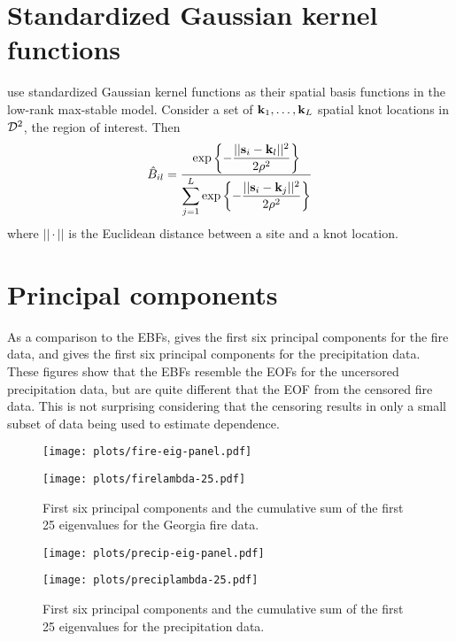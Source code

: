 \section{Standardized Gaussian kernel functions} \label{eba:gskfunctions}
\citet{Reich2012} use standardized Gaussian kernel functions as their spatial basis functions in the low-rank max-stable model.
Consider a set of $\mathbf{k}_1, \ldots, \mathbf{k}_L$ spatial knot locations in ${\cal D}^2$, the region of interest.
Then
\begin{align}
  \hat{B}_{il} = \frac{\exp\left\{- \displaystyle\frac{||\mathbf{s}_i - \mathbf{k}_l||^2}{2 \rho^2} \right\}}{\displaystyle \sum_{j = 1}^L \exp\left\{- \frac{||\mathbf{s}_i - \mathbf{k}_j||^2}{2 \rho^2} \right\}}
\end{align}
where $|| \cdot ||$ is the Euclidean distance between a site and a knot location.

\section{Principal components} \label{eba:pca}
As a comparison to the EBFs,  gives the first six principal components for the fire data, and  gives the first six principal components for the precipitation data.
These figures show that the EBFs resemble the EOFs  for the uncersored precipitation data, but are quite different that the EOF from the censored fire data.
This is not surprising considering that the censoring results in only a small subset of data being used to estimate dependence.
\begin{figure}[htbp] %
  \centering
  \texttt{[image: plots/fire-eig-panel.pdf]}

  \texttt{[image: plots/firelambda-25.pdf]}
  \caption{First six principal components and the cumulative sum of the first 25 eigenvalues for the Georgia fire data.}
  \label{ebfig:fire-eigpanel}
\end{figure}


\begin{figure}[htbp]  %
  \centering
  \texttt{[image: plots/precip-eig-panel.pdf]}

  \texttt{[image: plots/preciplambda-25.pdf]}
  \caption{First six principal components and the cumulative sum of the first 25 eigenvalues for the precipitation data.}
  \label{ebfig:precip-eigpanel}
\end{figure}